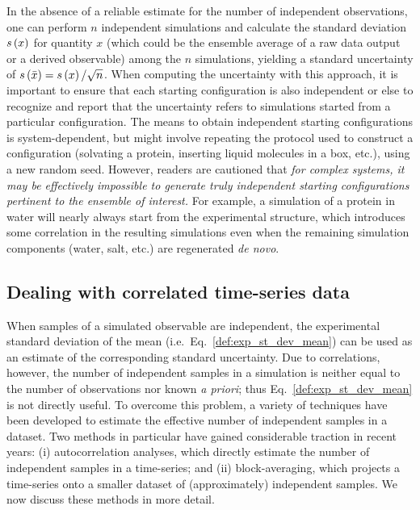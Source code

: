 In the absence of a reliable estimate for the number of independent observations, one can perform $n$ independent simulations and calculate the standard deviation $s\left( x \right)$ for quantity $x$ (which could be the ensemble average of a raw data output or a derived observable) among the $n$ simulations, yielding a standard uncertainty of $s\left( \bar{x} \right) = s\left( x \right) / \sqrt{n}$.  When computing the uncertainty with this approach, it is important to ensure that each starting configuration is also independent or else to recognize and report that the uncertainty refers to simulations started from a particular configuration.  The means to obtain independent starting configurations is system-dependent, but might involve repeating the protocol used to construct a configuration (solvating a protein, inserting liquid molecules in a box, etc.), using a new random seed.  However, readers are cautioned that \emph{for complex systems, it may be effectively impossible to generate truly independent starting configurations pertinent to the ensemble of interest.}  For example, a simulation of a protein in water will nearly always start from the experimental structure, which introduces some correlation in the resulting simulations even when the remaining simulation components (water, salt, etc.) are regenerated {\it de novo}.  

\subsection{Dealing with correlated time-series data}

When samples of a simulated observable are independent, the experimental standard deviation of the mean (i.e.\  Eq.~\hyperref[def:exp_st_dev]{\ref{def:exp_st_dev_mean}}) can be used as an estimate of the corresponding standard uncertainty.  Due to correlations, however, the number of independent samples in a simulation is neither equal to the number of observations nor known {\it a priori}; thus Eq.~\ref{def:exp_st_dev_mean} is not directly useful.  To overcome this problem, a variety of techniques have been developed to estimate the effective number of independent samples in a dataset.  Two methods in particular have gained considerable traction in recent years:  (i) autocorrelation analyses, which directly estimate the number of independent samples in a time-series; and (ii) block-averaging, which projects a time-series onto a smaller dataset of (approximately) independent samples.  We now discuss these methods in more detail.


